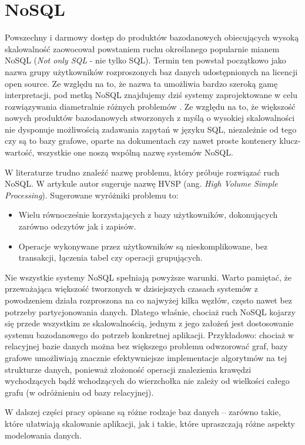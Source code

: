 \section{NoSQL}
Powszechny i darmowy dostęp do produktów bazodanowych obiecujących wysoką skalowalność zaowocował powstaniem ruchu określanego popularnie mianem NoSQL (\emph{Not only SQL} - nie tylko SQL).
Termin ten powstał początkowo jako nazwa grupy użytkowników rozproszonych baz danych udostępnionych na licencji open source.
Ze względu na to, że nazwa ta umożliwia bardzo szeroką gamę interpretacji, pod metką NoSQL znajdujemy dziś systemy zaprojektowane w celu rozwiązywania diametralnie różnych problemów \cite{evans-nosql-what-is-in-a-name}. 
Ze względu na to, że większość nowych produktów bazodanowych stworzonych z myślą o wysokiej skalowalności nie dysponuje możliwością zadawania zapytań w języku SQL, niezależnie od tego czy są to bazy grafowe, oparte na dokumentach czy nawet proste kontenery klucz-wartość, wszystkie one noszą wspólną nazwę systemów NoSQL.

W literaturze trudno znaleźć nazwę problemu, który próbuje rozwiązać ruch NoSQL. 
W artykule \cite{monash-db-hvsp} autor sugeruje nazwę HVSP (ang. \emph{High Volume Simple Processing}). 
Sugerowane wyróżniki problemu to:
\begin{itemize}
 \item Wielu równocześnie korzystających z bazy użytkowników, dokonujących zarówno odczytów jak i zapisów.
 \item Operacje wykonywane przez użytkowników są nieskomplikowane, bez transakcji, łączenia tabel czy operacji grupujących.
\end{itemize}

Nie wszystkie systemy NoSQL spełniają powyższe warunki.
Warto pamiętać, że przeważająca większość tworzonych w dzisiejszych czasach systemów z powodzeniem działa rozproszona na co najwyżej kilka węzłów, często nawet bez potrzeby partycjonowania danych.
Dlatego właśnie, chociaż ruch NoSQL kojarzy się przede wszystkim ze skalowalnością, jednym z jego założeń jest dostosowanie systemu bazodanowego do potrzeb konkretnej aplikacji.
Przykładowo: chociaż w relacyjnej bazie danych można bez większego problemu odwzorować graf, bazy grafowe umożliwiają znacznie efektywniejsze implementacje algorytmów na tej strukturze danych, ponieważ złożoność operacji znalezienia krawędzi wychodzących bądź wchodzących do wierzchołka nie zależy od wielkości całego grafu (w odróżnieniu od bazy relacyjnej).

W dalszej części pracy opisane są różne rodzaje baz danych -- zarówno takie, które ułatwiają skalowanie aplikacji, jak i takie, które upraszczają różne aspekty modelowania danych. 